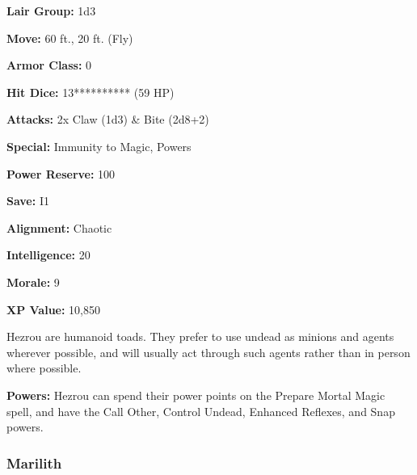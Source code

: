 \begin{multicols*}{2}
{\textbf{Lair Group:} 1d3

\textbf{Move:} 60 ft., 20 ft. (Fly)

\textbf{Armor Class:} 0

\textbf{Hit Dice:} 13********** (59 HP)

\textbf{Attacks:} 2x Claw (1d3) \& Bite (2d8+2)

\textbf{Special:} Immunity to Magic, Powers

\textbf{Power Reserve:} 100

\textbf{Save:} I1

\textbf{Alignment:} Chaotic

\textbf{Intelligence:} 20

\textbf{Morale:} 9

\textbf{XP Value:} 10,850}

Hezrou are humanoid toads. They prefer to use undead as minions and agents wherever possible, and will usually act through such agents rather than in person where possible.

\textbf{Powers:} Hezrou can spend their power points on the Prepare Mortal Magic spell, and have the Call Other, Control Undead, Enhanced Reflexes, and Snap powers.

\subsubsection{Marilith}


\end{multicols*}

